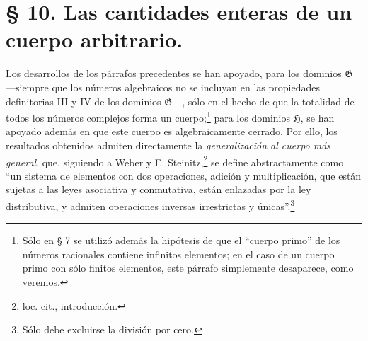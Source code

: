 \section*{§ 10. Las cantidades enteras de un cuerpo arbitrario.}

Los desarrollos de los párrafos precedentes se han apoyado, para los dominios $\mathfrak G$ ---siempre que los números algebraicos no se incluyan en las propiedades definitorias III y IV de los dominios $\mathfrak G$---, sólo en el hecho de que la totalidad de todos los números complejos forma un cuerpo;\footnote{Sólo en § 7 se utilizó además la hipótesis de que el ``cuerpo primo'' de los números racionales contiene infinitos elementos; en el caso de un cuerpo primo con sólo finitos elementos, este párrafo simplemente desaparece, como veremos.} para los dominios $\mathfrak H$, se han apoyado además en que este cuerpo es algebraicamente cerrado. Por ello, los resultados obtenidos admiten directamente la \emph{generalización al cuerpo más general}, que, siguiendo a Weber y E. Steinitz,\footnote{loc. cit., introducción.} se define abstractamente como ``un sistema de elementos con dos operaciones, adición y multiplicación, que están sujetas a las leyes asociativa y conmutativa, están enlazadas por la ley distributiva, y admiten operaciones inversas irrestrictas y únicas''.\footnote{Sólo debe excluirse la división por cero.}

